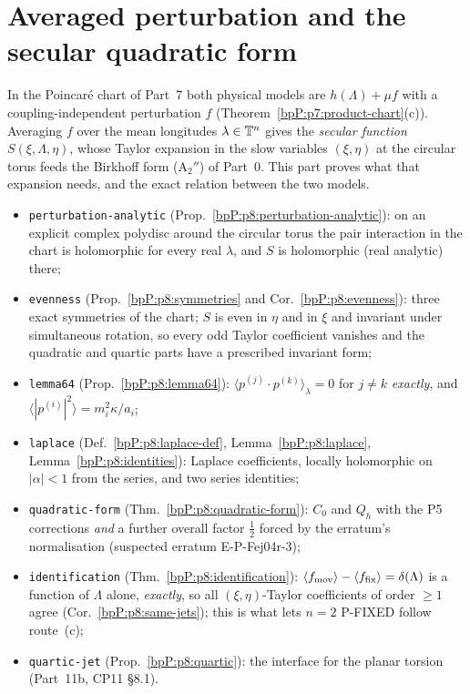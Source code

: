 \section{Averaged perturbation and the secular quadratic form}\label{bpP:p8}
\begingroup\sloppy

In the Poincar\'e chart of Part~7 both physical models are $h(\Lambda)+\mu f$ with a coupling-independent perturbation $f$ (Theorem~\ref{bpP:p7:product-chart}(c)). Averaging $f$ over the mean longitudes $\lambda\in\mathbb{T}^n$ gives the \emph{secular function} $S(\xi,\Lambda,\eta)$, whose Taylor expansion in the slow variables $(\xi,\eta)$ at the circular torus feeds the Birkhoff form (A$_2''$) of Part~0. This part proves what that expansion needs, and the exact relation between the two models.
\begin{itemize}
\item \texttt{perturbation-analytic} (Prop.~\ref{bpP:p8:perturbation-analytic}): on an explicit complex polydisc around the circular torus the pair interaction in the chart is holomorphic for every real $\lambda$, and $S$ is holomorphic (real analytic) there;
\item \texttt{evenness} (Prop.~\ref{bpP:p8:symmetries} and Cor.~\ref{bpP:p8:evenness}): three exact symmetries of the chart; $S$ is even in $\eta$ and in $\xi$ and invariant under simultaneous rotation, so every odd Taylor coefficient vanishes and the quadratic and quartic parts have a prescribed invariant form;
\item \texttt{lemma64} (Prop.~\ref{bpP:p8:lemma64}): $\langle p^{(j)}\cdot p^{(k)}\rangle_\lambda=0$ for $j\ne k$ \emph{exactly}, and $\langle|p^{(i)}|^2\rangle=m_i^2\kappa/a_i$;
\item \texttt{laplace} (Def.~\ref{bpP:p8:laplace-def}, Lemma~\ref{bpP:p8:laplace}, Lemma~\ref{bpP:p8:identities}): Laplace coefficients, locally holomorphic on $|\alpha|<1$ from the series, and two series identities;
\item \texttt{quadratic-form} (Thm.~\ref{bpP:p8:quadratic-form}): $C_0$ and $Q_h$ with the P5 corrections \emph{and} a further overall factor $\tfrac12$ forced by the erratum's normalisation (suspected erratum E-P-Fej04r-3);
\item \texttt{identification} (Thm.~\ref{bpP:p8:identification}): $\langle f_{\rm mov}\rangle-\langle f_{\rm fix}\rangle=\delta(\Lambda)$ is a function of $\Lambda$ alone, \emph{exactly}, so all $(\xi,\eta)$-Taylor coefficients of order $\ge1$ agree (Cor.~\ref{bpP:p8:same-jets}); this is what lets $n=2$ P-FIXED follow route~(c);
\item \texttt{quartic-jet} (Prop.~\ref{bpP:p8:quartic}): the interface for the planar torsion (Part~11b, CP11 \S8.1).
\end{itemize}

